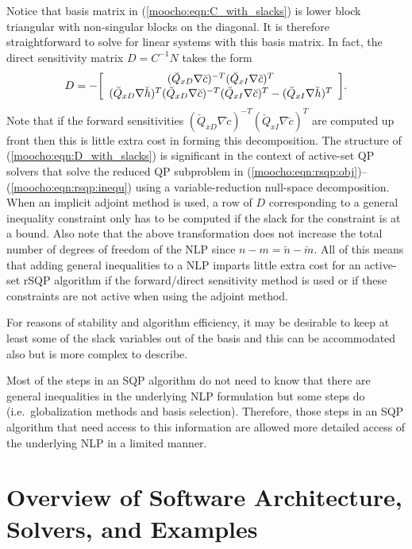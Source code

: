 \documentclass[pdf,ps2pdf,11pt]{SANDreport}
\begin{document}
{{Notice that basis matrix in (\ref{moocho:eqn:C_with_slacks}) is lower block
triangular with non-singular blocks on the diagonal.  It is therefore straightforward to solve
for linear systems with this basis matrix.  In fact, the direct sensitivity matrix
$D = C^{-1} N$ takes the form
%
\begin{equation}
D = - {\bmat{c}
	( \breve{Q}_{xD} \nabla \breve{c} )^{-T} ( \breve{Q}_{xI} \nabla \breve{c} )^{T} \\
    ( \breve{Q}_{xD} \nabla \breve{h} )^T ( \breve{Q}_{xD} \nabla \breve{c} )^{-T} ( \breve{Q}_{xI} \nabla \breve{c} )^{T}
      -( \breve{Q}_{xI} \nabla \breve{h} )^T
\emat}.
\label{moocho:eqn:D_with_slacks}
\end{equation}
%
Note that if the forward sensitivities $( \breve{Q}_{xD} {}\nabla {}\breve{c}
)^{-T} ( \breve{Q}_{xI} {}\nabla {}\breve{c} )^{T}$ are computed up front then
this is little extra cost in forming this decomposition.  The structure of
(\ref{moocho:eqn:D_with_slacks}) is significant in the context of active-set
QP solvers that solve the reduced QP subproblem in
(\ref{moocho:eqn:rsqp:obj})--(\ref{moocho:eqn:rsqp:inequ}) using a
variable-reduction null-space decomposition.  When an implicit adjoint method
is used, a row of $D$ corresponding to a general inequality constraint only
has to be computed if the slack for the constraint is at a bound.  Also note
that the above transformation does not increase the total number of degrees of
freedom of the NLP since $n-m = {}\breve{n}-\breve{m}$.  All of this means
that adding general inequalities to a NLP imparts little extra cost for an
active-set rSQP algorithm if the forward/direct sensitivity method is used or
if these constraints are not active when using the adjoint method.

For reasons of stability and algorithm efficiency, it may be desirable to keep
at least some of the slack variables out of the basis and this can be
accommodated also but is more complex to describe.

Most of the steps in an SQP algorithm do not need to know that there are
general inequalities in the underlying NLP formulation but some steps do
(i.e.\ globalization methods and basis selection).  Therefore, those steps in
an SQP algorithm that need access to this information are allowed more
detailed access of the underlying NLP in a limited manner.

%
\section{Overview of Software Architecture, Solvers, and Examples}
%

}}
\end{document}
